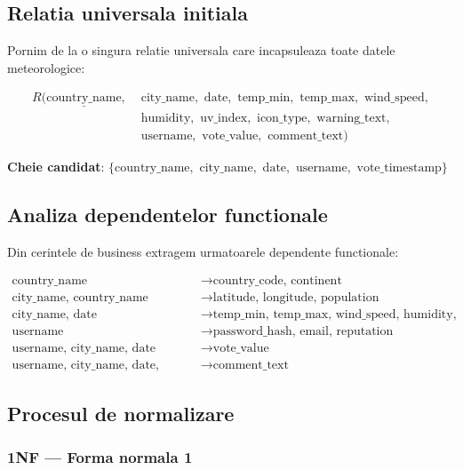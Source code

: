 \documentclass[12pt,a4paper]{article}
\begin{document}
\subsection{Relatia universala initiala}

Pornim de la o singura relatie universala care incapsuleaza toate datele meteorologice:

\begin{align*}
R(\underline{\text{country\_name}}, &\text{ city\_name}, \text{ date}, \text{ temp\_min}, \text{ temp\_max}, \text{ wind\_speed}, \\
&\text{ humidity}, \text{ uv\_index}, \text{ icon\_type}, \text{ warning\_text}, \\
&\text{ username}, \text{ vote\_value}, \text{ comment\_text})
\end{align*}

\textbf{Cheie candidat}: $\{\text{country\_name}, \text{ city\_name}, \text{ date}, \text{ username}, \text{ vote\_timestamp}\}$

\subsection{Analiza dependentelor functionale}

Din cerintele de business extragem urmatoarele dependente functionale:

\begin{align*}
\text{country\_name} &\rightarrow \text{country\_code, continent} \\
\text{city\_name, country\_name} &\rightarrow \text{latitude, longitude, population} \\
\text{city\_name, date} &\rightarrow \text{temp\_min, temp\_max, wind\_speed, humidity, uv\_index, icon\_type, warning\_text} \\
\text{username} &\rightarrow \text{password\_hash, email, reputation} \\
\text{username, city\_name, date} &\rightarrow \text{vote\_value} \\
\text{username, city\_name, date, comment\_timestamp} &\rightarrow \text{comment\_text}
\end{align*}

\subsection{Procesul de normalizare}

\subsubsection{1NF --- Forma normala 1}
\end{document}
